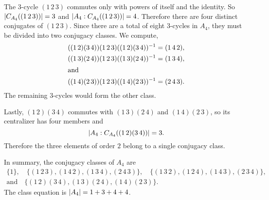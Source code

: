 \begin{enumerate}
\begin{solution}
    The $3$-cycle $(1\,2\,3)$ commutes only with powers of itself and
    the identity. So $\lvert{C_{A_4}((1\,2\,3))}\rvert = 3$ and
    $\lvert{A_4 : C_{A_4}((1\,2\,3))}\rvert = 4$. Therefore there are four
    distinct conjugates of $(1\,2\,3)$. Since there are a total of
    eight $3$-cycles in $A_4$, they must be divided into two conjugacy
    classes. We compute,
    \begin{gather*}
      ((1\,2)(3\,4))(1\,2\,3)((1\,2)(3\,4))^{-1}
      = (1\,4\,2), \\
      ((1\,3)(2\,4))(1\,2\,3)((1\,3)(2\,4))^{-1}
      = (1\,3\,4), \\ \intertext{and}
      ((1\,4)(2\,3))(1\,2\,3)((1\,4)(2\,3))^{-1}
      = (2\,4\,3).
    \end{gather*}
    The remaining $3$-cycles would form the other class.

    Lastly, $(1\,2)(3\,4)$ commutes with $(1\,3)(2\,4)$ and
    $(1\,4)(2\,3)$, so its centralizer has four members and
    \begin{equation*}
      \lvert{A_4 : C_{A_4}((1\,2)(3\,4))}\rvert = 3.
    \end{equation*}
    Therefore the three elements of order $2$ belong to a single
    conjugacy class.

    In summary, the conjugacy classes of $A_4$ are
    \begin{multline*}
      \{1\}, \quad
      \{(1\,2\,3), (1\,4\,2), (1\,3\,4), (2\,4\,3)\}, \quad
      \{(1\,3\,2), (1\,2\,4), (1\,4\,3), (2\,3\,4)\}, \\\text{and}\quad
      \{(1\,2)(3\,4), (1\,3)(2\,4), (1\,4)(2\,3)\}.
    \end{multline*}
    The class equation is $\lvert{A_4}\rvert = 1 + 3 + 4 + 4$.
  \end{solution}
\end{enumerate}

